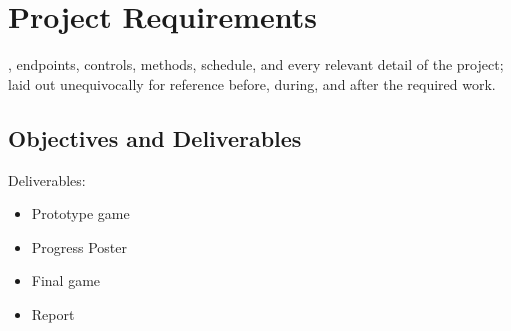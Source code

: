 \chapter[Project Requirements]{Project Requirements}
\label{ch:reference}


, endpoints, controls, methods, schedule, and every relevant detail of the project; laid out unequivocally for reference before, during, and after the required work.

\section{Objectives and Deliverables}

Deliverables:

\begin{itemize}\itemsep-3pt
	\item Prototype game
	\item Progress Poster
	\item Final game
	\item Report
\end{itemize}






